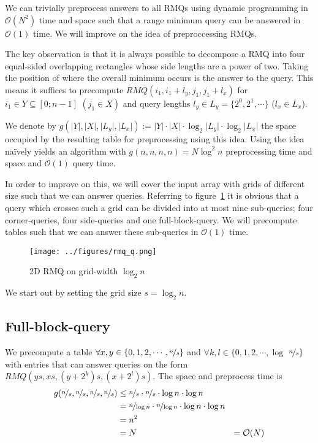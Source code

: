 \documentclass[a4paper,oneside,article,11pt]{memoir}
\begin{document}
We can trivially preprocess answers to all RMQs using dynamic programming in $\mathcal{O}(N^2)$ time and space such that a range minimum query can be answered in $\mathcal{O}(1)$ time. We will improve on the idea of preproccessing RMQs.

The key observation is that it is always possible to decompose a RMQ into four equal-sided overlapping rectangles whose side lengths are a power of two. Taking the position of where the overall minimum occurs is the answer to the query. This means it suffices to precompute $RMQ(i_1,i_1 + l_y,j_1,j_1 + l_x)$ for $i_1 \in Y \subseteq [0;n-1]$ $(j_1 \in X)$ and query lengths $l_y \in L_y = \{2^0, 2^1, \cdots \}$ ($l_x \in L_x$).

We denote by $g(\lvert Y \rvert, \lvert X \rvert, \lvert L_y \rvert, \lvert L_x \rvert) := \lvert Y \rvert \cdot \lvert X \rvert \cdot \log_2 \lvert L_y \rvert \cdot \log_2 \lvert L_x \rvert$ the space occupied by the resulting table for preprocessing using this idea. Using the idea naïvely yields an algorithm with $g(n,n,n,n) = N \log^2 n$ preprocessing time and space and $\mathcal{O}(1)$ query time.

In order to improve on this, we will cover the input array with grids of different size such that we can answer queries. Referring to figure~\ref{fig:rmq_2d} it is obvious that a query which crosses such a grid can be divided into at most nine sub-queries; four corner-queries, four side-queries and one full-block-query. We will precompute tables such that we can answer these sub-queries in $\mathcal{O}(1)$ time.

\begin{figure}[H]
    \centering    
    \texttt{[image: ../figures/rmq\_q.png]}
    \caption{2D RMQ on grid-width $\log_2 n$}
    \label{fig:rmq_2d}
\end{figure}

We start out by setting the grid size $s = \log_2 n$.

\subsection{Full-block-query}
We precompute a table $\forall x,y \in \{0,1,2, \cdots, \nicefrac{n}{s} \}$ and $\forall k,l \in \{0,1,2, \cdots, \log$ $\nicefrac{n}{s} \}$ with entries that can answer queries on the form $RMQ(ys,xs,(y+2^k)s,(x+2^l)s)$. The space and preprocess time is
\begin{align}
g(\nicefrac{n}{s}, \nicefrac{n}{s}, \nicefrac{n}{s}, \nicefrac{n}{s}) &\leq \nicefrac{n}{s} \cdot \nicefrac{n}{s} \cdot \log n \cdot \log n \\ &= \nicefrac{n}{\log n} \cdot \nicefrac{n}{\log n} \cdot \log n \cdot \log n \\ &= n^2 \\ &= N &= \mathcal{O}(N)
\end{align}
\end{document}
